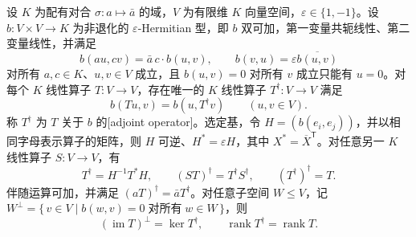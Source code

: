 \begin{proposition}\label{b2:prop:form-adjoint-operator}
	设 \(K\) 为配有对合 \(\sigma:a\mapsto\bar a\) 的域，\(V\) 为有限维 \(K\) 向量空间，\(\varepsilon\in\{1,-1\}\)。设 \(b:V\times V\to K\) 为非退化的 \(\varepsilon\)-Hermitian 型，即 \(b\) 双可加，第一变量共轭线性、第二变量线性，并满足
	\[
		b(au,cv)=\bar a\,c\cdot b(u,v),\qquad b(v,u)=\varepsilon\overline{b(u,v)}
	\]
	对所有 \(a,c\in K\)、\(u,v\in V\) 成立，且 \(b(u,v)=0\) 对所有 \(v\) 成立只能有 \(u=0\)。对每个 \(K\) 线性算子 \(T:V\rightarrow V\)，存在唯一的 \(K\) 线性算子 \(T^\dagger:V\rightarrow V\) 满足
	\[
		b(Tu,v)=b(u,T^\dagger v)\qquad(u,v\in V).
	\]
	称 \(T^\dagger\) 为 \(T\) 关于 \(b\) 的[adjoint operator]。选定基，令 \(H=(b(e_i,e_j))\)，并以相同字母表示算子的矩阵，则 \(H\) 可逆、\(H^*=\varepsilon H\)，其中 \(X^*=\overline X^{\mathsf T}\)。对任意另一 \(K\) 线性算子 \(S:V\rightarrow V\)，有
	\[
		T^\dagger=H^{-1}T^*H,\qquad (ST)^\dagger=T^\dagger S^\dagger,\qquad (T^\dagger)^\dagger=T.
	\]
	伴随运算可加，并满足 \((aT)^\dagger=\bar aT^\dagger\)。对任意子空间 \(W\le V\)，记 \(W^\perp=\{\,v\in V\mid b(w,v)=0\;\text{对所有}\;w\in W\,\}\)，则
	\[
		(\operatorname{im}T)^\perp=\ker T^\dagger,\qquad \operatorname{rank}T^\dagger=\operatorname{rank}T.
	\]
\end{proposition}
